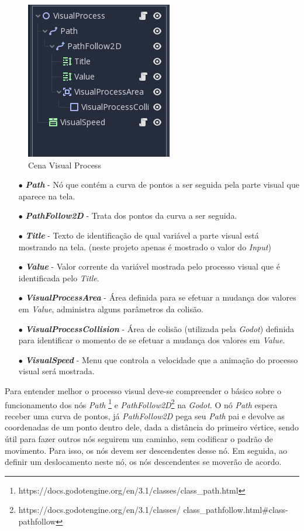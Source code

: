 \begin{figure}[H]
    \includegraphics[scale=0.8]{../figuras/cena_visual_process.png}
    \caption{Cena Visual Process}
\end{figure}

\begin{itemize}
    \item[$\bullet$]
        \textbf{\textit{Path}} - Nó que contém a curva de pontos a ser seguida 
        pela parte visual que aparece na tela.
    \item[$\bullet$]
        \textbf{\textit{PathFollow2D}} - Trata dos pontos da curva a ser 
        seguida.
    \item[$\bullet$]
        \textbf{\textit{Title}} - Texto de identificação de qual variável a 
        parte visual está mostrando na tela. (neste projeto apenas é mostrado 
        o valor do \textit{Input})
    \item[$\bullet$]
        \textbf{\textit{Value}} - Valor corrente da variável mostrada pelo
        processo visual que é identificada pelo \textit{Title}.
    \item[$\bullet$]
        \textbf{\textit{VisualProcessArea}} - Área definida para se efetuar a
        mudança dos valores em \textit{Value}, administra alguns parâmetros da
        colisão.
    \item[$\bullet$]
        \textbf{\textit{VisualProcessCollision}} - Área de colisão (utilizada
        pela \textit{Godot}) definida para identificar o momento de se efetuar 
        a mudança dos valores em \textit{Value}.
    \item[$\bullet$]
        \textbf{\textit{VisualSpeed}} - Menu que controla a velocidade que a 
        animação do processo visual será mostrada. 
\end{itemize}

Para entender melhor o processo visual deve-se compreender o básico sobre o
funcionamento dos nós \textit{Path}
\footnote{https://docs.godotengine.org/en/3.1/classes/class\_path.html} e 
\textit{PathFollow2D}\footnote{https://docs.godotengine.org/en/3.1/classes/
class\_pathfollow.html\#class-pathfollow} na \textit{Godot}.
O nó \textit{Path} espera receber uma curva de pontos, já \textit{PathFollow2D}
pega seu \textit{Path}  pai e devolve as coordenadas de um ponto dentro dele, 
dada a distância do primeiro vértice, sendo útil para fazer outros nós seguirem 
um caminho, sem codificar o padrão de movimento. Para isso, os nós devem ser 
descendentes desse nó. Em seguida, ao  definir um deslocamento neste nó, os nós 
descendentes se moverão de acordo.

